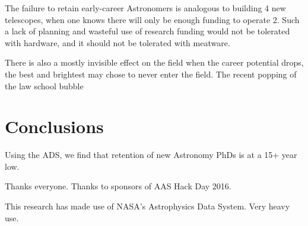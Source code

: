 \documentclass{emulateapj}
\begin{document}
The failure to retain early-career Astronomers is analogous to building 4 new telescopes, when one knows there will only be enough funding to operate 2.  Such a lack of planning and wasteful use of research funding would not be tolerated with hardware, and it should not be tolerated with meatware. 

There is also a mostly invisible effect on the field when the career potential drops, the best and brightest may chose to never enter the field.  The recent popping of the law school bubble %



\section{Conclusions}
Using the ADS, we find that retention of new Astronomy PhDs is at a 15+ year low.  


\acknowledgments
Thanks everyone. Thanks to sponsors of AAS Hack Day 2016.

This research has made use of NASA's Astrophysics Data System. Very heavy use.


\end{document}
